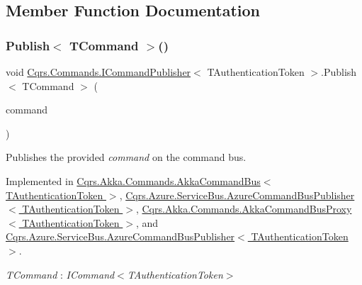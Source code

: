 \subsection{Member Function Documentation}
\mbox{\label{interfaceCqrs_1_1Commands_1_1ICommandPublisher_aeeb487ad5686d9c44d214b1daaf7833a}} 
\subsubsection{\texorpdfstring{Publish$<$ T\+Command $>$()}{Publish< TCommand >()}\hspace{0.1cm}{\footnotesize\ttfamily [1/2]}}
{\footnotesize\ttfamily void \hyperlink{interfaceCqrs_1_1Commands_1_1ICommandPublisher}{Cqrs.\+Commands.\+I\+Command\+Publisher}$<$ T\+Authentication\+Token $>$.Publish$<$ T\+Command $>$ (\begin{DoxyParamCaption}\item[{T\+Command}]{command }\end{DoxyParamCaption})}



Publishes the provided {\itshape command}  on the command bus. 



Implemented in \hyperlink{classCqrs_1_1Akka_1_1Commands_1_1AkkaCommandBus_a48e1d46035b1e1a3251636b8a03f7dae}{Cqrs.\+Akka.\+Commands.\+Akka\+Command\+Bus$<$ T\+Authentication\+Token $>$}, \hyperlink{classCqrs_1_1Azure_1_1ServiceBus_1_1AzureCommandBusPublisher_aefdaed600f88cc645a1b7ab41db42a69}{Cqrs.\+Azure.\+Service\+Bus.\+Azure\+Command\+Bus\+Publisher$<$ T\+Authentication\+Token $>$}, \hyperlink{classCqrs_1_1Akka_1_1Commands_1_1AkkaCommandBusProxy_a410c0fe52016d04de950b1ae767d2ccb}{Cqrs.\+Akka.\+Commands.\+Akka\+Command\+Bus\+Proxy$<$ T\+Authentication\+Token $>$}, and \hyperlink{classCqrs_1_1Azure_1_1ServiceBus_1_1AzureCommandBusPublisher_aefdaed600f88cc645a1b7ab41db42a69}{Cqrs.\+Azure.\+Service\+Bus.\+Azure\+Command\+Bus\+Publisher$<$ T\+Authentication\+Token $>$}.

\begin{Desc}
\item[Type Constraints]\begin{description}
\item[{\em T\+Command} : {\em I\+Command$<$T\+Authentication\+Token$>$}]\end{description}
\end{Desc}
\mbox{\label{interfaceCqrs_1_1Commands_1_1ICommandPublisher_af0f033c0b949e5650032e4f00b11b595}} 
